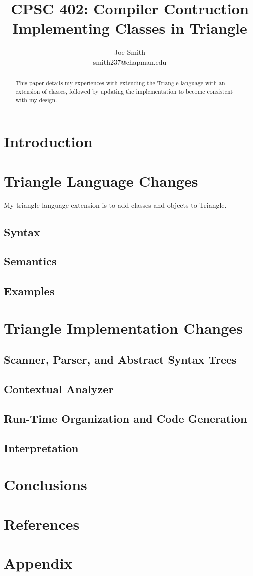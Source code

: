 \documentclass[10pt,letterpaper]{article}
\author{Joe Smith\\smith237@chapman.edu}
\title{\textbf{CPSC 402: Compiler Contruction\\Implementing Classes in Triangle}}
\begin{document}
\maketitle
\begin{abstract}
This paper details my experiences with extending the Triangle language with an extension of classes, followed by updating the implementation to become consistent with my design. 
\end{abstract}
\section{Introduction}

\section{Triangle Language Changes}
My triangle language extension is to add classes and objects to Triangle.
\subsection{Syntax}
\subsection{Semantics}
\subsection{Examples}

\section{Triangle Implementation Changes}
\subsection{Scanner, Parser, and Abstract Syntax Trees}
\subsection{Contextual Analyzer}
\subsection{Run-Time Organization and Code Generation}
\subsection{Interpretation}

\section{Conclusions}
\section*{References}
\section*{Appendix}
%
\end{document}
